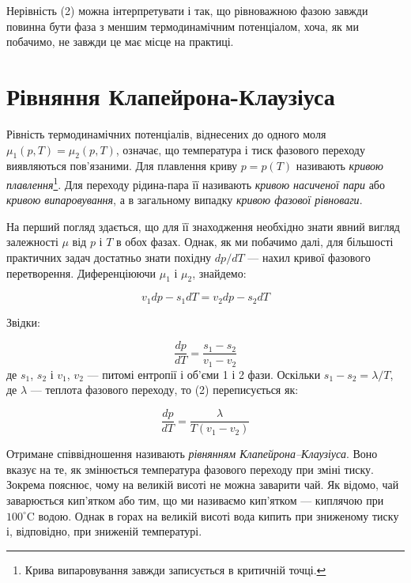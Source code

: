 Нерівність (2) можна інтерпретувати і так, що рівноважною фазою завжди повинна бути фаза з меншим
термодинамічним потенціалом, хоча, як ми побачимо, не завжди це має місце на практиці.

\section{Рівняння Клапейрона-Клаузіуса}

Рівність термодинамічних потенціалів, віднесених до одного моля $\mu_1(p,T) =
\mu_2(p,T)$, означає, що температура і тиск фазового переходу виявляються пов'язаними. Для плавлення
криву $p = p(T)$ називають \emph{кривою плавлення}\footnote{Крива випаровування завжди записується в
критичній точці.}. Для переходу рідина-пара її називають \emph{кривою насиченої пари} або
\emph{кривою випаровування}, а в загальному випадку \emph{кривою фазової рівноваги}.

На перший погляд здається, що для її знаходження необхідно знати явний вигляд залежності $\mu$ від $p$
і $T$ в обох фазах. Однак, як ми побачимо далі, для більшості практичних задач достатньо знати похідну
$dp/dT$ --- нахил кривої фазового перетворення. Диференціюючи $\mu_1$ і $\mu_2$, знайдемо:

\begin{equation}
v_1 dp - s_1 dT = v_2 dp - s_2 dT
\end{equation}

Звідки:

\begin{equation}
\frac{dp}{dT} = \frac{s_1 - s_2}{v_1 - v_2}
\end{equation}
%
де $s_1$, $s_2$ і $v_1$, $v_2$ --- питомі ентропії і об'єми 1 і 2 фази. Оскільки $s_1 - s_2 =
\lambda/T$, де $\lambda$ --- теплота фазового переходу, то (2) переписується як:

\begin{equation}\label{eq:clapeyron}
\frac{dp}{dT} = \frac{\lambda}{T(v_1 - v_2)}
\end{equation}

Отримане співвідношення називають \emph{рівнянням Клапейрона--Клаузіуса}. Воно вказує на те, як
змінюється температура фазового переходу при зміні тиску. Зокрема пояснює, чому на великій висоті не
можна заварити чай. Як відомо, чай заварюється кип'ятком або тим, що ми називаємо кип'ятком ---
киплячою при $100^\circ$C водою. Однак в горах на великій висоті вода кипить при зниженому тиску і,
відповідно, при зниженій температурі.

